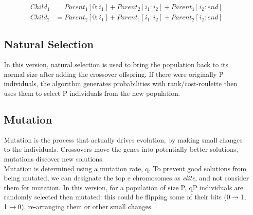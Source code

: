 \begin{align}
    Child_1 &= Parent_1[0:i_1] + Parent_2[i_1:i_2] +  Parent_1[i_2:end] \nonumber\\
    Child_2 &= Parent_2[0:i_1] + Parent_1[i_1:i_2] + Parent_2[i_2:end] \nonumber
\end{align}

\subsection{Natural Selection}
In this version, natural selection is used to bring the population back to its normal size after adding the crossover offspring. If there were originally P individuals, the algorithm generates probabilities with rank/cost-roulette then uses them to select P individuals from the new population.

\subsection{Mutation}
Mutation is the process that actually drives evolution, by making small changes to the individuals. Crossovers move the genes into potentially better solutions, mutations discover new solutions. \\

\noindent Mutation is determined using a mutation rate, q. To prevent good solutions from being mutated, we can designate the top e chromosomes as \emph{elite}, and not consider them for mutation. In this version, for a population of size P, qP individuals are randomly selected then mutated: this could be flipping some of their bits (0$\rightarrow$1, 1$\rightarrow$0), re-arranging them or other small changes.


